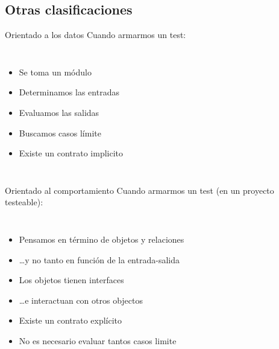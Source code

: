 \subsection{Otras clasificaciones}

\begin{frame}[fragile]{Orientado a los datos}
Cuando armarmos un test:
\begin{columns}[onlytextwidth]
	\begin{itemize}
		\item Se toma un m\'odulo
		\item Determinamos las entradas
		\item Evaluamos las salidas
		\item Buscamos casos l\'imite
		\item Existe un contrato implicito
	\end{itemize}
	
\end{columns}
\end{frame}

\begin{frame}{Orientado al comportamiento}
Cuando armarmos un test (en un proyecto testeable):
\begin{columns}[onlytextwidth]
	\begin{itemize}
		\item Pensamos en t\'ermino de objetos y relaciones
		\item \ldots y no tanto en funci\'on de la entrada-salida
		\item Los objetos tienen interfaces
		\item \ldots e interactuan con otros objectos
		\item Existe un contrato expl\'icito
		\item No es necesario evaluar tantos casos limite
	\end{itemize}
\end{columns}
\end{frame}

